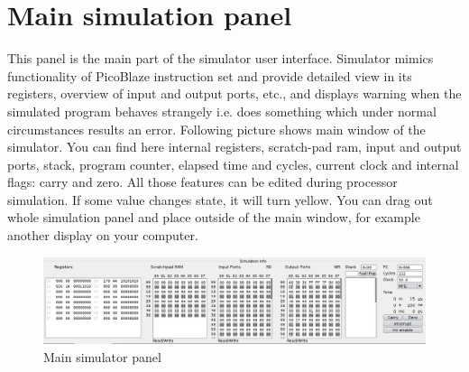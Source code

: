 \section{Main simulation panel}
    This panel is the main part of the simulator user interface. Simulator mimics functionality of PicoBlaze instruction set and provide detailed view in its registers, overview of input and output ports, etc., and displays warning when the simulated program behaves strangely i.e. does something which under normal circumstances results an error. Following picture shows main window of the simulator. You can find here internal registers, scratch-pad ram, input and output ports, stack, program counter, elapsed time and cycles, current clock and internal flags: carry and zero. All those features can be edited during processor simulation. If some value changes state, it will turn yellow. You can drag out whole simulation panel and place outside of the main window, for example another display on your computer.

   \begin{figure}[h!]
        \centering
        \includegraphics[width=\textwidth]{img/bottom_panel.png}
        \caption{Main simulator panel}
    \end{figure}

